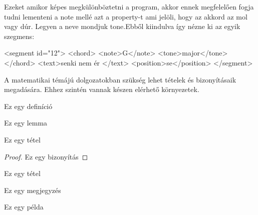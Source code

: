 Ezeket amikor képes megkülönböztetni a program, akkor ennek megfelelően fogja tudni lementeni a note mellé azt a property-t ami jelöli, hogy az akkord az mol vagy dúr. Legyen a neve mondjuk tone.Ebből kiindulva így nézne ki az egyik szegmens:
\begin{xml}
<segment id="12">
  <chord>
    <note>G</note>
    <tone>major</tone>
  </chord>
  <text>senki nem ér </text>
  <position>se</position>
</segment>
\end{xml}



A matematikai témájú dolgozatokban szükség lehet tételek és bizonyításaik megadására.
Ehhez szintén vannak készen elérhető környezetek.

\begin{definition}
Ez egy definíció
\end{definition}

\begin{lemma}
Ez egy lemma
\end{lemma}

\begin{theorem}
Ez egy tétel
\end{theorem}

\begin{proof}
Ez egy bizonyítás
\end{proof}

\begin{corollary}
Ez egy tétel
\end{corollary}

\begin{remark}
Ez egy megjegyzés
\end{remark}

\begin{example}
Ez egy példa
\end{example}
